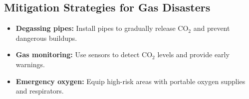 \documentclass{article}
\begin{document}
\subsection{Mitigation Strategies for Gas Disasters}
\begin{itemize}
    \item \textbf{Degassing pipes:} Install pipes to gradually release CO$_2$ and prevent dangerous buildups.
    \item \textbf{Gas monitoring:} Use sensors to detect CO$_2$ levels and provide early warnings.
    \item \textbf{Emergency oxygen:} Equip high-risk areas with portable oxygen supplies and respirators.
\end{itemize}
\end{document}
